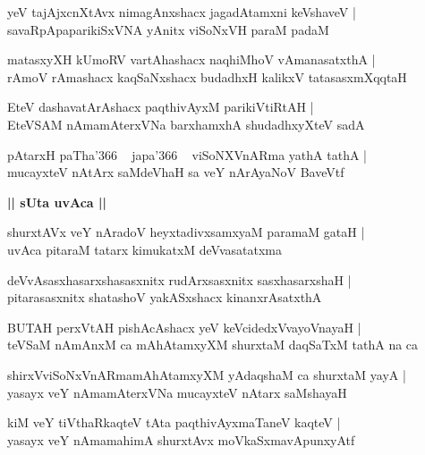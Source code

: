 \documentclass[twoside,12pt,openright]{book}
\newcounter{shloka}[chapter]
\def\uvaca#1{\centerline{{\large\textbf{#1}}}}
\begin{document}
\begin{shloka}%
yeV tajAjxcnXtAvx nimagAnxshacx jagadAtamxni keVshaveV |\\
savaRpApaparikiSxVNA yAnitx viSoNxVH paraM padaM 
\end{shloka}

\begin{shloka}%
matasxyXH kUmoRV vartAhashacx naqhiMhoV vAmanasatxthA |\\
rAmoV rAmashacx kaqSaNxshacx budadhxH kalikxV tatasasxmXqqtaH 
\end{shloka}

\begin{shloka}%
EteV dashavatArAshacx paqthivAyxM parikiVtiRtAH |\\
EteVSAM nAmamAterxVNa barxhamxhA shudadhxyXteV sadA 
\end{shloka}

\begin{shloka}%
pAtarxH paTha\char'366 ~ japa\char'366 ~ viSoNXVnARma yathA tathA |\\
mucayxteV nAtArx saMdeVhaH sa veY nArAyaNoV BaveVtf 
\end{shloka}

\uvaca{|| sUta uvAca ||}

\begin{shloka}%
shurxtAVx veY nAradoV heyxtadivxsamxyaM paramaM gataH |\\
uvAca pitaraM tatarx kimukatxM deVvasatatxma
\end{shloka}

\begin{shloka}%
deVvAsasxhasarxshasasxnitx rudArxsasxnitx sasxhasarxshaH |\\
pitarasasxnitx shatashoV yakASxshacx kinanxrAsatxthA 
\end{shloka}

\begin{shloka}%
BUTAH perxVtAH pishAcAshacx yeV keVcidedxVvayoVnayaH |\\
teVSaM nAmAnxM ca mAhAtamxyXM shurxtaM daqSaTxM tathA na ca 
\end{shloka}

\begin{shloka}%
shirxVviSoNxVnARmamAhAtamxyXM yAdaqshaM ca shurxtaM yayA |\\
yasayx veY nAmamAterxVNa mucayxteV nAtarx saMshayaH
\end{shloka}

\begin{shloka}%
kiM veY tiVthaRkaqteV tAta paqthivAyxmaTaneV kaqteV |\\
yasayx veY nAmamahimA shurxtAvx moVkaSxmavApunxyAtf 
\end{shloka}
\end{document}
